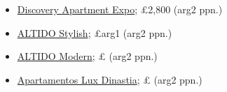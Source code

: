 \documentclass[12pt]{article}
\newcommand{\cost}[2]{\pounds#1 (#2 ppn.)}
\begin{document}
\begin{itemize}
		\item 
		\href{https://www.booking.com/hotel/pt/discovery-apartment.html?aid=355028;sid=3f62ec944d118827daff72c411262409;all_sr_blocks=126941004_337661817_9_0_0%2C126941005_337661817_2_0_0;checkin=2022-05-28;checkout=2022-06-05;dest_id=-2167973;dest_type=city;dist=0;group_adults=10;group_children=0;hapos=8;highlighted_blocks=126941004_337661817_9_0_0%2C126941005_337661817_2_0_0;hpos=8;matching_block_id=126941004_337661817_9_0_0;no_rooms=1;req_adults=10;req_children=0;room1=A%2CA%2CA%2CA%2CA%2CA%2CA%2CA%2CA%2CA;sb_price_type=total;sr_order=popularity;sr_pri_blocks=126941004_337661817_9_0_0__251800%2C126941005_337661817_2_0_0__79600;srepoch=1648314704;srpvid=b13d78e7745e0106;type=total;ucfs=1&#hotelTmpl}{Discovery Apartment Expo}; \cost{2,800}{arg2}
		\item 
		\href{URL}{ALTIDO Stylish}; \cost{arg1}{arg2}
		\item 
		\href{URL}{ALTIDO Modern}; \cost{}{arg2}
		\item 
		\href{URL}{Apartamentos Lux Dinastia}; \cost{}{arg2}
	\end{itemize}
	
\end{document}
